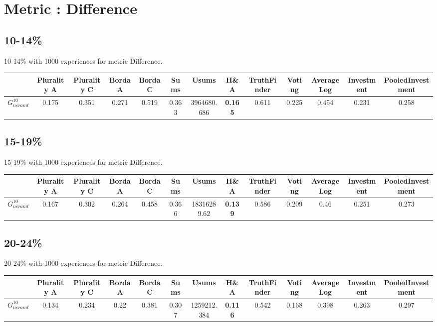 \documentclass{article}
\newcommand{\graph}[2]{$G_{#1}^{#2}$}
\begin{document}
\section{Metric : Difference}

\newpage

\subsection{10-14\%}

10-14\% with 1000 experiences for metric Difference.

\noindent\begin{tabular}{|l|c|c|c|c|c|c|c|c|c|c|c|c|}
\hline
& Plurality A& Plurality C& Borda A& Borda C& Sums& Usums& H\&A& TruthFinder& Voting& AverageLog& Investment& PooledInvestment\\
\hline
\graph{ncrand}{10} &0.175&0.351&0.271&0.519&0.363&3964680.686&\textbf{0.165}&0.611&0.225&0.454&0.231&0.258\\
\hline
\end{tabular}
\newpage

\subsection{15-19\%}

15-19\% with 1000 experiences for metric Difference.

\noindent\begin{tabular}{|l|c|c|c|c|c|c|c|c|c|c|c|c|}
\hline
& Plurality A& Plurality C& Borda A& Borda C& Sums& Usums& H\&A& TruthFinder& Voting& AverageLog& Investment& PooledInvestment\\
\hline
\graph{ncrand}{10} &0.167&0.302&0.264&0.458&0.366&18316289.62&\textbf{0.139}&0.586&0.209&0.46&0.251&0.273\\
\hline
\end{tabular}
\newpage

\subsection{20-24\%}

20-24\% with 1000 experiences for metric Difference.

\noindent\begin{tabular}{|l|c|c|c|c|c|c|c|c|c|c|c|c|}
\hline
& Plurality A& Plurality C& Borda A& Borda C& Sums& Usums& H\&A& TruthFinder& Voting& AverageLog& Investment& PooledInvestment\\
\hline
\graph{ncrand}{10} &0.134&0.234&0.22&0.381&0.307&1259212.384&\textbf{0.116}&0.542&0.168&0.398&0.263&0.297\\
\hline
\end{tabular}
\newpage
\end{document}
